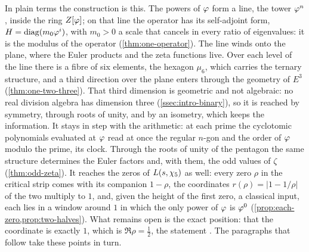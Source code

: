 In plain terms the construction is this.  The powers of $\varphi$ form a line, the tower $\varphi^n$, inside
the ring $Z[\varphi]$; on that line the operator has its self-adjoint form, $H=\operatorname{diag}(m_0\varphi^i)$, with $m_0>0$ a scale that cancels in every ratio of eigenvalues: it is the modulus of the operator (\cref{thm:one-operator}).  The line winds onto the plane, where the Euler products and the zeta functions
live.  Over each level of the line there is a fibre of six elements, the hexagon $\mu_6$, which carries the
ternary structure, and a third direction over the plane enters through the geometry of $E^3$
(\cref{thm:one-two-three}).  That third dimension is geometric and not algebraic: no real division algebra has
dimension three (\cref{ssec:intro-binary}), so it is reached by symmetry, through roots of unity, and by an
isometry, which keeps the information.  It stays in step with the arithmetic: at each prime the cyclotomic
polynomials evaluated at $\varphi$ read at once the regular $n$-gon and the order of $\varphi$ modulo the prime,
its clock.  Through the roots of unity of the pentagon the same structure determines the Euler factors and,
with them, the odd values of $\zeta$ (\cref{thm:odd-zeta}).  It reaches the zeros of $L(s,\chi_5)$ as well: every
zero $\rho$ in the critical strip comes with its companion $1-\rho$, the coordinates $r(\rho)=|1-1/\rho|$ of the
two multiply to $1$, and, given the height of the first zero, a classical input, each lies in a window around $1$ in which the only power of $\varphi$ is $\varphi^0$ (\cref{prop:each-zero,prop:two-halves}).  What remains open is the exact position: that the coordinate is
exactly $1$, which is $\Re\rho=\tfrac12$, the statement \Ecore.  The paragraphs that follow take these points in
turn.

